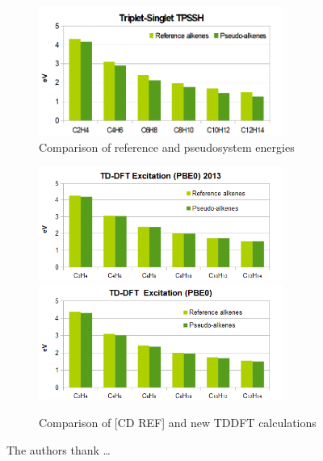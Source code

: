 \documentclass[journal=jctcce,manuscript=article]{achemso}
\begin{document}
\begin{figure}
\includegraphics[width=8cm]{tpssh_excitation}
 \caption{\label{fig:hf_excitation}Comparison of reference and pseudosystem energies}
\end{figure}
\begin{figure}
\includegraphics[width=8cm]{tddft_excitation_cd}
\includegraphics[width=8cm]{tddft_excitation}
 \caption{\label{fig:hf_excitation}Comparison of [CD REF] and new TDDFT calculations}
\end{figure}


\begin{acknowledgement}

The authors thank \ldots

\end{acknowledgement}
\end{document}
